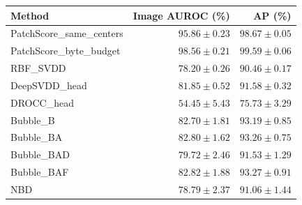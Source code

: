 \begin{tabular}{lrr}
\hline
Method & Image AUROC (\%) & AP (\%) \\
\hline
PatchScore\_same\_centers & $95.86 \pm 0.23$ & $98.67 \pm 0.05$ \\
PatchScore\_byte\_budget & $98.56 \pm 0.21$ & $99.59 \pm 0.06$ \\
RBF\_SVDD & $78.20 \pm 0.26$ & $90.46 \pm 0.17$ \\
DeepSVDD\_head & $81.85 \pm 0.52$ & $91.58 \pm 0.32$ \\
DROCC\_head & $54.45 \pm 5.43$ & $75.73 \pm 3.29$ \\
Bubble\_B & $82.70 \pm 1.81$ & $93.19 \pm 0.85$ \\
Bubble\_BA & $82.80 \pm 1.62$ & $93.26 \pm 0.75$ \\
Bubble\_BAD & $79.72 \pm 2.46$ & $91.53 \pm 1.29$ \\
Bubble\_BAF & $82.82 \pm 1.88$ & $93.27 \pm 0.91$ \\
NBD & $78.79 \pm 2.37$ & $91.06 \pm 1.44$ \\
\hline
\end{tabular}
